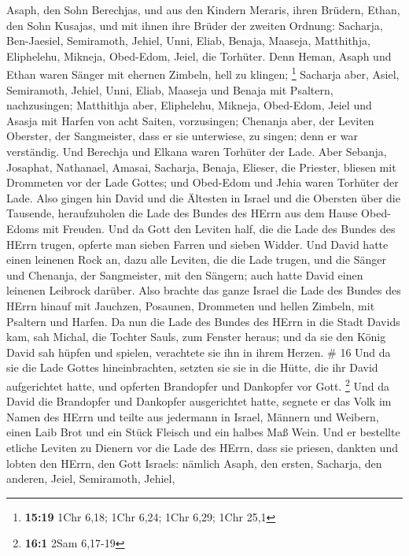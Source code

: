 Asaph, den Sohn Berechjas, und aus den Kindern Meraris, ihren Brüdern,
Ethan, den Sohn Kusajas,  und mit ihnen ihre Brüder der
zweiten Ordnung: Sacharja, Ben-Jaesiel, Semiramoth, Jehiel, Unni, Eliab,
Benaja, Maaseja, Matthithja, Eliphelehu, Mikneja, Obed-Edom, Jeiel, die
Torhüter.  Denn Heman, Asaph und Ethan waren Sänger mit
ehernen Zimbeln, hell zu klingen; \footnote{\textbf{15:19} 1Chr 6,18;
  1Chr 6,24; 1Chr 6,29; 1Chr 25,1}  Sacharja aber, Asiel,
Semiramoth, Jehiel, Unni, Eliab, Maaseja und Benaja mit Psaltern,
nachzusingen;  Matthithja aber, Eliphelehu, Mikneja,
Obed-Edom, Jeiel und Asasja mit Harfen von acht Saiten, vorzusingen;
 Chenanja aber, der Leviten Oberster, der Sangmeister, dass
er sie unterwiese, zu singen; denn er war verständig.  Und
Berechja und Elkana waren Torhüter der Lade.  Aber Sebanja,
Josaphat, Nathanael, Amasai, Sacharja, Benaja, Elieser, die Priester,
bliesen mit Drommeten vor der Lade Gottes; und Obed-Edom und Jehia waren
Torhüter der Lade.  Also gingen hin David und die Ältesten
in Israel und die Obersten über die Tausende, heraufzuholen die Lade des
Bundes des HErrn aus dem Hause Obed-Edoms mit Freuden.  Und
da Gott den Leviten half, die die Lade des Bundes des HErrn trugen,
opferte man sieben Farren und sieben Widder.  Und David
hatte einen leinenen Rock an, dazu alle Leviten, die die Lade trugen,
und die Sänger und Chenanja, der Sangmeister, mit den Sängern; auch
hatte David einen leinenen Leibrock darüber.  Also brachte
das ganze Israel die Lade des Bundes des HErrn hinauf mit Jauchzen,
Posaunen, Drommeten und hellen Zimbeln, mit Psaltern und Harfen.
 Da nun die Lade des Bundes des HErrn in die Stadt Davids
kam, sah Michal, die Tochter Sauls, zum Fenster heraus; und da sie den
König David sah hüpfen und spielen, verachtete sie ihn in ihrem Herzen.
\# 16  Und da sie die Lade Gottes hineinbrachten, setzten
sie sie in die Hütte, die ihr David aufgerichtet hatte, und opferten
Brandopfer und Dankopfer vor Gott. \footnote{\textbf{16:1} 2Sam 6,17-19}
 Und da David die Brandopfer und Dankopfer ausgerichtet
hatte, segnete er das Volk im Namen des HErrn  und teilte
aus jedermann in Israel, Männern und Weibern, einen Laib Brot und ein
Stück Fleisch und ein halbes Maß Wein.  Und er bestellte
etliche Leviten zu Dienern vor die Lade des HErrn, dass sie priesen,
dankten und lobten den HErrn, den Gott Israels:  nämlich
Asaph, den ersten, Sacharja, den anderen, Jeiel, Semiramoth, Jehiel,
